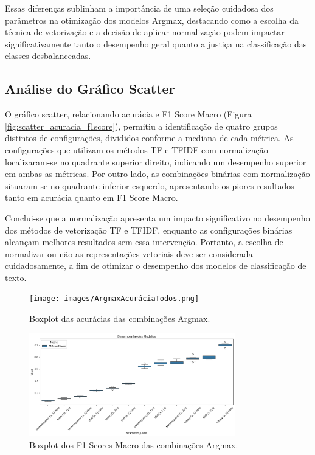 Essas diferenças sublinham a importância de uma seleção cuidadosa dos parâmetros na otimização dos modelos Argmax, destacando como a escolha da técnica de vetorização e a decisão de aplicar normalização podem impactar significativamente tanto o desempenho geral quanto a justiça na classificação das classes desbalanceadas.

\subsection{Análise do Gráfico Scatter}

O gráfico scatter, relacionando acurácia e F1 Score Macro (Figura \ref{fig:scatter_acuracia_f1score}), permitiu a identificação de quatro grupos distintos de configurações, divididos conforme a mediana de cada métrica. As configurações que utilizam os métodos TF e TFIDF com normalização localizaram-se no quadrante superior direito, indicando um desempenho superior em ambas as métricas. Por outro lado, as combinações binárias com normalização situaram-se no quadrante inferior esquerdo, apresentando os piores resultados tanto em acurácia quanto em F1 Score Macro.

Conclui-se que a normalização apresenta um impacto significativo no desempenho dos métodos de vetorização TF e TFIDF, enquanto as configurações binárias alcançam melhores resultados sem essa intervenção. Portanto, a escolha de normalizar ou não as representações vetoriais deve ser considerada cuidadosamente, a fim de otimizar o desempenho dos modelos de classificação de texto.

\begin{figure}[H]
    \centering
    \texttt{[image: images/ArgmaxAcuráciaTodos.png]}
    \caption{Boxplot das acurácias das combinações Argmax.}
    \label{fig:boxplot_acuracia}
\end{figure}

\begin{figure}[H]
    \centering
    \includegraphics[width=0.8\textwidth]{images/ArgmaxF1ScoreTodos.png}
    \caption{Boxplot dos F1 Scores Macro das combinações Argmax.}
    \label{fig:boxplot_f1score}
\end{figure}

